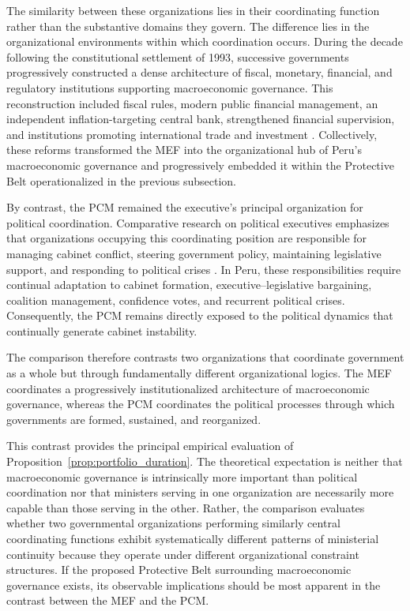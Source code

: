 \documentclass[doc, 12pt, a4paper,floatsintext]{apa7}
\begin{document}
The similarity between these organizations lies in their coordinating function rather than the substantive domains they govern. The difference lies in the organizational environments within which coordination occurs. During the decade following the constitutional settlement of 1993, successive governments progressively constructed a dense architecture of fiscal, monetary, financial, and regulatory institutions supporting macroeconomic governance. This reconstruction included fiscal rules, modern public financial management, an independent inflation-targeting central bank, strengthened financial supervision, and institutions promoting international trade and investment \parencite{santos_peru_2015}. Collectively, these reforms transformed the MEF into the organizational hub of Peru's macroeconomic governance and progressively embedded it within the Protective Belt operationalized in the previous subsection.

By contrast, the PCM remained the executive's principal organization for political coordination. Comparative research on political executives emphasizes that organizations occupying this coordinating position are responsible for managing cabinet conflict, steering government policy, maintaining legislative support, and responding to political crises \parencite{grotz_how_2021,marland_power_2025}. In Peru, these responsibilities require continual adaptation to cabinet formation, executive--legislative bargaining, coalition management, confidence votes, and recurrent political crises. Consequently, the PCM remains directly exposed to the political dynamics that continually generate cabinet instability.

The comparison therefore contrasts two organizations that coordinate government as a whole but through fundamentally different organizational logics. The MEF coordinates a progressively institutionalized architecture of macroeconomic governance, whereas the PCM coordinates the political processes through which governments are formed, sustained, and reorganized.

This contrast provides the principal empirical evaluation of Proposition~\ref{prop:portfolio_duration}. The theoretical expectation is neither that macroeconomic governance is intrinsically more important than political coordination nor that ministers serving in one organization are necessarily more capable than those serving in the other. Rather, the comparison evaluates whether two governmental organizations performing similarly central coordinating functions exhibit systematically different patterns of ministerial continuity because they operate under different organizational constraint structures. If the proposed Protective Belt surrounding macroeconomic governance exists, its observable implications should be most apparent in the contrast between the MEF and the PCM.
\end{document}
